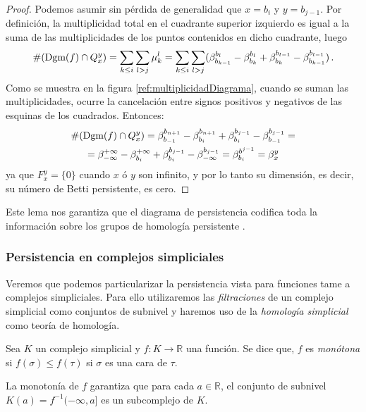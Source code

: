 \begin{proof}
Podemos asumir sin pérdida de generalidad que $x = b_i$ y $y = b_{j-1}$. Por definición, la multiplicidad total en el cuadrante superior izquierdo es igual a la suma de las multiplicidades de los puntos contenidos en dicho cuadrante, luego
\[
\#(\text{\rm Dgm}(f) \cap Q_{x}^{y}) = \sum_{k \leq i} \sum_{l > j}  \mu_{k}^{l} =
\sum_{k \leq i} \sum_{l > j} (\beta_{b_{k-1}}^{b_l} - \beta_{b_k}^{b_l} + \beta_{b_k}^{b_{l-1}} - \beta_{b_{k-1}}^{b_{l-1}})\,.
\]
Como se muestra en la figura \ref{ref:multiplicidadDiagrama}, cuando se suman las multiplicidades, ocurre la cancelación entre signos positivos y negativos de las esquinas de los cuadrados. Entonces:
\begin{gather*}
\#(\text{\rm Dgm}(f) \cap Q_{x}^{y}) = \beta_{b_{-1}}^{b_{n+1}} - \beta_{b_{i}}^{b_{n+1}} + \beta_{b_i}^{b_{j-1}} - \beta_{b_{-1}}^{b_{j-1}} =\\
= \beta_{-\infty}^{+\infty} - \beta_{b_{i}}^{+\infty} + \beta_{b_i}^{b_{j-1}} - \beta_{-\infty}^{b_{j-1}} = \beta_{b_i}^{b^{j-1}} = \beta_{x}^{y}
\end{gather*}
ya que $F_{x}^{y}= \{0\}$ cuando $x$ ó $y$ son infinito, y por lo tanto su dimensión, es decir, su número de Betti persistente, es cero.
\end{proof}

Este lema nos garantiza que el diagrama de persistencia codifica toda la información sobre los grupos de homología persistente \cite{libroEH}.

\subsubsection*{Persistencia en complejos simpliciales}
Veremos que podemos particularizar la persistencia vista para funciones tame a complejos simpliciales. Para ello utilizaremos las \emph{filtraciones} de un complejo simplicial como conjuntos de subnivel y haremos uso de la \emph{homología simplicial} como teoría de homología.

\begin{definition}
Sea $K$ un complejo simplicial y $f: K \to \mathbb{R}$ una función. Se dice que, $f$ es \emph{monótona} si $f(\sigma) \leq f(\tau)$ si $\sigma$ es una cara de $\tau$.
\end{definition}
\begin{sloppypar}
La monotonía de $f$ garantiza que para cada $a \in \mathbb{R}$, el conjunto de subnivel ${K(a) = f^{-1}(-\infty,a]}$ es un subcomplejo de $K$.
\end{sloppypar}


